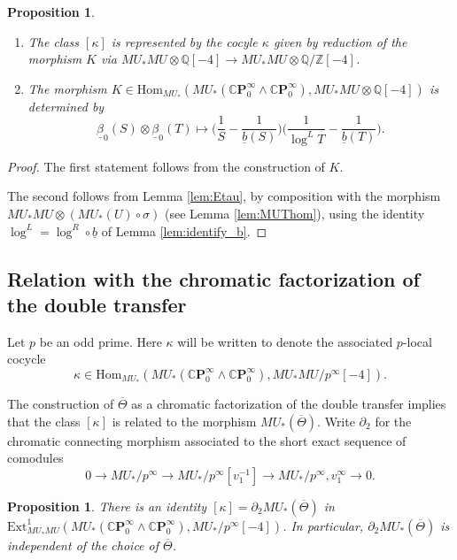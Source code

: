 \documentclass[10pt,a4paper]{amsart}
\newtheorem{prop}[thm]{Proposition}
\theoremstyle{definition}
\theoremstyle{remark}
\newcommand{\qz}{{\rat/\zed}}
\renewcommand{\hom}{\mathrm{Hom}}
\newcommand{\ext}{\mathrm{Ext}}
\newcommand{\zed}{\mathbb{Z}}
\newcommand{\rat}{\mathbb{Q}}
\newcommand{\cp}{\mathbb{C} \mathbf{P}^\infty}
\renewcommand{\smash}{\wedge}
\begin{document}
\begin{prop}
 \label{prop:calculate_Xi}
\
\begin{enumerate}
	\item
The class $[\kappa]$ is represented by the cocyle $\kappa$
given by reduction  of the morphism $K$ via $MU_*MU \otimes \rat  [-4]
\rightarrow
MU_*MU \otimes \qz[-4]$.
\item
The morphism $K \in \hom_{MU_*} (MU_* (\cp_0\smash \cp_0), MU_*MU \otimes
\rat [-4])$ is determined by
\[
 \underline{\beta}_0 (S) \otimes \underline{\beta}_0 (T)
\mapsto
\Big(
\frac{1}{S}- \frac{1}{\underline{b}(S)}
\Big)
\Big(
\frac{1}{\log^L T }
- \frac{1}{\underline{b}(T)}
\Big).
\]
\end{enumerate}
\end{prop}

\begin{proof}
The first statement follows from the construction of $K$.

The second follows from Lemma \ref{lem:Etau}, by composition with the morphism
$MU_*MU \otimes (MU_*(U) \circ\sigma)$ (see Lemma \ref{lem:MUThom}), using the identity $\log^L = \log^R \circ \underline{b}$ of Lemma \ref{lem:identify_b}.
\end{proof}


\subsection{Relation with the chromatic factorization of the double transfer}
\label{subsect:relate-double-chromatic}


Let $p$ be an odd prime. Here $\kappa$ will be written to denote the associated $p$-local cocycle
\[
	\kappa
\in \hom_{MU_*} (MU_* (\cp_0\smash \cp_0) , MU_*MU/p^{\infty}[-4]).
\]


The construction of $\overline{\Theta}$ as a chromatic factorization
of the double transfer implies that the  class $[\kappa]$ is related to the morphism $MU_*(\overline{\Theta})$. Write
$\partial_2$ for the chromatic connecting morphism associated to the short exact
sequence of comodules
\[
	0
\rightarrow MU_* /p^\infty
 \rightarrow
MU_* /p^\infty [v_1 ^{-1}]
\rightarrow
MU_* /p^\infty ,v_1 ^\infty
\rightarrow 0.
\]

\begin{prop}
\label{prop:second-factorization}
	There is an identity
$
	[\kappa ] = \partial _2 MU_* (\overline{\Theta})
$
in $\ext^1_{MU_*MU} (MU_* (\cp_0\smash \cp_0 ), MU_*/p^\infty [-4])$. In particular, $\partial_2 MU_* (\overline{\Theta}) $ is independent of the choice of $\overline{\Theta}$.
\end{prop}
\end{document}
